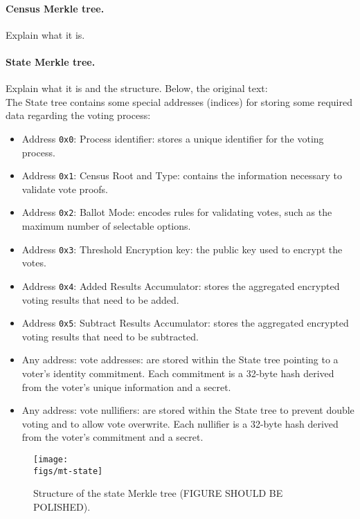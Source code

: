 \paragraph{Census Merkle tree.} Explain what it is. \\


\paragraph{State Merkle tree.} Explain what it is and the structure. Below, the original text:\\

The State tree contains some special addresses (indices) for storing some required data regarding the voting process:

\begin{itemize}
	\item Address \texttt{0x0}: Process identifier: stores a unique identifier for the voting process.
	\item Address \texttt{0x1}: Census Root and Type: contains the information necessary to validate vote proofs.
	\item Address \texttt{0x2}: Ballot Mode: encodes rules for validating votes, such as the maximum number of selectable options.
	\item Address \texttt{0x3}: Threshold Encryption key: the public key used to encrypt the votes.
	\item Address \texttt{0x4}: Added Results Accumulator: stores the aggregated encrypted voting results that need to be added.
	\item Address \texttt{0x5}: Subtract Results Accumulator: stores the aggregated encrypted voting results that need to be subtracted.
	\item Any address: vote addresses: are stored within the State tree pointing to a voter's identity commitment. Each commitment is a 32-byte hash derived from the voter's unique information and a secret.
	\item Any address: vote nullifiers: are stored within the State tree to prevent double voting and to allow vote overwrite. Each nullifier is a 32-byte hash derived from the voter's commitment and a secret.
\end{itemize}

\begin{figure}[h]
	\centerline{\texttt{[image: \\figs/mt-state]}}
	\caption{Structure of the state Merkle tree (FIGURE SHOULD BE POLISHED).}
	\label{fig:mt-state}
\end{figure}

